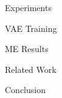\documentclass{article}
\begin{document}
\begin{psection}{Experiments}

	\begin{psubsection}{VAE Training}


	\end{psubsection}

	\begin{psubsection}{ME Results}


	\end{psubsection}

\end{psection}

\begin{psection}{Related Work}

\end{psection}


\begin{psection}{Conclusion}

\end{psection}



\end{document}
